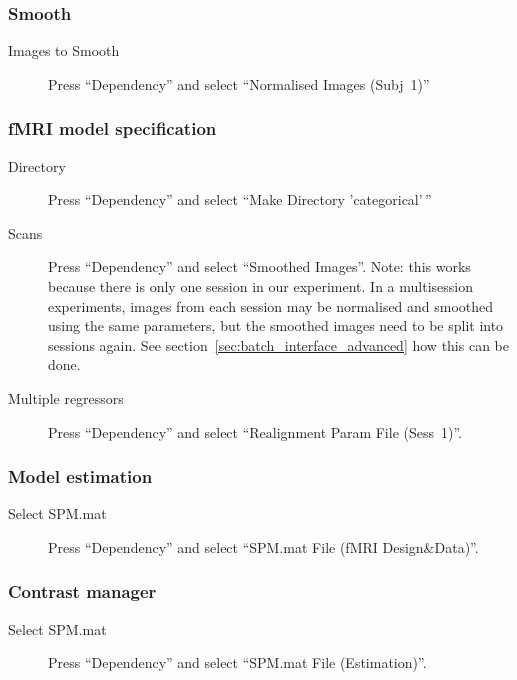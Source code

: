 \documentclass[a4paper]{book}
\begin{document}
\subsubsection*{Smooth}

\begin{description}
\item[Images to Smooth] Press ``Dependency'' and select ``Normalised Images
  (Subj~1)''
\end{description}

\subsubsection*{fMRI model specification}

\begin{description}
\item[Directory] Press ``Dependency'' and select ``Make Directory
  'categorical'\,''
\item[Scans] Press ``Dependency'' and select ``Smoothed Images''. Note: this
  works because there is only one session in our experiment. In a
  multisession experiments, images from each session may be normalised and
  smoothed using the same parameters, but the smoothed images need to be
  split into sessions again. See section~\ref{sec:batch_interface_advanced}
  how this can be done.
\item[Multiple regressors] Press ``Dependency'' and select ``Realignment
  Param File (Sess~1)''.
\end{description}

\subsubsection*{Model estimation}

\begin{description}
\item[Select SPM.mat] Press ``Dependency'' and select ``SPM.mat File (fMRI
  Design\&Data)''.
\end{description}

\subsubsection*{Contrast manager}

\begin{description}
\item[Select SPM.mat] Press ``Dependency'' and select ``SPM.mat File
  (Estimation)''. 
\end{description}
\end{document}
